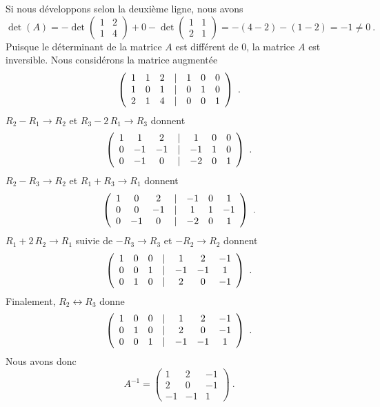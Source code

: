 { Si nous développons selon la deuxième ligne, nous avons
\[
\det(A) = -\det \begin{pmatrix} 1 & 2 \\ 1 & 4 \end{pmatrix}
+0 -\det \begin{pmatrix} 1 & 1 \\ 2 & 1 \end{pmatrix}
= -(4-2) -(1-2) = -1 \neq 0 \ .
\]
Puisque le déterminant de la matrice $A$ est différent de $0$, la
matrice $A$ est inversible.  Nous considérons la matrice augmentée
\[
\left(\begin{array}{ccc@{\quad | \quad}ccc}
1 & 1 & 2 & 1 & 0 & 0 \\1 & 0 & 1 & 0 & 1 & 0 \\2 & 1 & 4 & 0 & 0 & 1
\end{array}\right) \ .
\]
$R_2-R_1\rightarrow R_2$ et $R_3-2\,R_1\rightarrow R_3$ donnent
\[
\left(\begin{array}{ccc@{\quad | \quad}ccc}
1 & 1 & 2 & 1 & 0 & 0 \\ 0 & -1 & -1 & -1 & 1 & 0 \\ 0 & -1 & 0 & -2 & 0 & 1
\end{array}\right) \ . 
\]
$R_2-R_3\rightarrow R_2$ et $R_1+R_3\rightarrow R_1$ donnent
\[
\left(\begin{array}{ccc@{\quad | \quad}ccc}
1 & 0 & 2 & -1 & 0 & 1 \\ 0 & 0 & -1 & 1 & 1 & -1 \\ 0 & -1 & 0 & -2 & 0 & 1
\end{array}\right) \ .
\]
$R_1+2\,R_2\rightarrow R_1$ suivie de $-R_3\rightarrow R_3$ et
$-R_2\rightarrow R_2$ donnent
\[
\left(\begin{array}{ccc@{\quad | \quad}ccc}
1 & 0 & 0 & 1 & 2 & -1 \\ 0 & 0 & 1 & -1 & -1 & 1 \\ 0 & 1 & 0 & 2 & 0 & -1
\end{array}\right) \ .
\]
Finalement, $R_2 \leftrightarrow R_3$ donne
\[
\left(\begin{array}{ccc@{\quad | \quad}ccc}
1 & 0 & 0 & 1 & 2 & -1 \\ 0 & 1 & 0 & 2 & 0 & -1 \\ 0 & 0 & 1 & -1 & -1 & 1
\end{array}\right) \ .
\]
Nous avons donc
\[
A^{-1} =
\begin{pmatrix} 1 & 2 & -1 \\ 2 & 0 & -1 \\ -1 & -1 & 1 \end{pmatrix} \ .
\]
}

